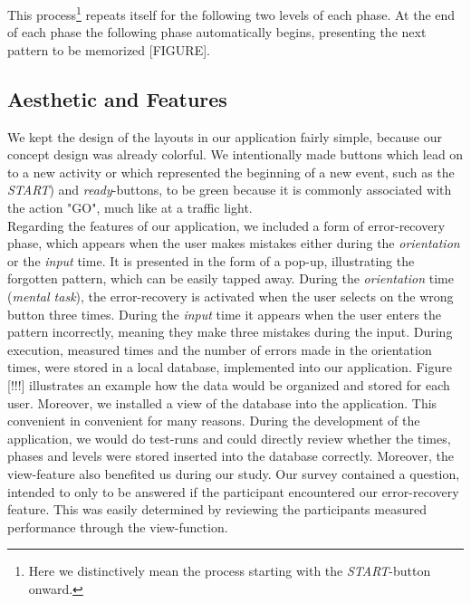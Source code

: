 This process\footnote{Here we distinctively mean the process starting with the \textit{START}-button onward.} repeats itself for the following two levels of each phase. At the end of each phase the following phase automatically begins, presenting the next pattern to be memorized [FIGURE].

\subsection{Aesthetic and Features}

We kept the design of the layouts in our application fairly simple, because our concept design was already colorful. We intentionally made buttons which lead on to a new activity or which represented the beginning of a new event, such as the \textit{START}) and \textit{ready}-buttons, to be green because it is commonly associated with the action "GO", much like at a traffic light. \\

Regarding the features of our application, we included a form of error-recovery phase, which appears when the user makes mistakes either during the \textit{orientation} or the \textit{input} time. It is presented in the form of a pop-up, illustrating the forgotten pattern, which can be easily tapped away. During the  \textit{orientation} time (\textit{mental task}), the error-recovery is activated when the user selects on the wrong button three times. During the \textit{input} time it appears when the user enters the pattern incorrectly, meaning they make three mistakes during the input. During execution, measured times and the number of errors made in the orientation times, were stored in a local database, implemented into our application. Figure [!!!] illustrates an example how the data would be organized and stored for each user. 
Moreover, we installed a view of the database into the application. This convenient in convenient for many reasons. During the development of the application, we would do test-runs and could directly review whether the times, phases and levels were stored inserted into the database correctly. Moreover, the view-feature also benefited us during our study. Our survey contained a question, intended to only to be answered if the participant encountered our error-recovery feature. This was easily determined by reviewing the participants measured performance through the view-function.  \\

